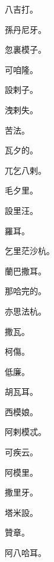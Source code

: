 \begin{pinyinscope}
 八吉打。



 孫丹尼牙。



 忽裏模子。



 可咱隆。



 設剌子。



 洩剌失。



 苦法。



 瓦夕的。



 兀乞八剌。



 毛夕里。



 設里汪。



 羅耳。



 乞里茫沙杭。



 蘭巴撒耳。



 那哈完的。



 亦思法杭。



 撒瓦。



 柯傷。



 低廉。



 胡瓦耳。



 西模娘。



 阿剌模忒。



 可疾云。



 阿模里。



 撒里牙。



 塔米設。



 贊章。



 阿八哈耳。




\end{pinyinscope}
